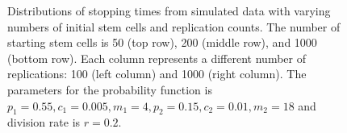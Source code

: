 \documentclass[11pt]{article}
\begin{document}
\begin{figure}[!ht]
    \caption{Distributions of stopping times from simulated data with varying numbers of initial stem cells and replication counts. The number of starting stem cells is 50 (top row), 200 (middle row), and 1000 (bottom row). Each column represents a different number of replications: 100 (left column) and 1000 (right column). The parameters for the probability function is $p_1 = 0.55, c_1 = 0.005, m_1 =4, p_2 = 0.15, c_2 = 0.01, m_2 = 18$ and division rate is $r = 0.2$. }
    \label{fig:placeholder}
\end{figure}
\end{document}
